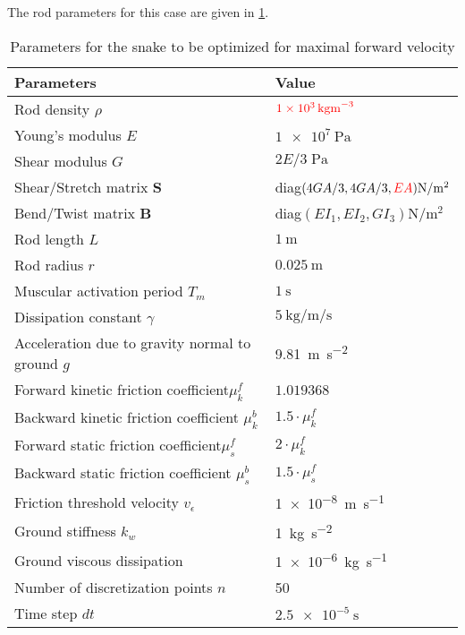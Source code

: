 \documentclass[11pt]{article}
\begin{document}
The rod parameters for this case are given in \cref{tab_opt_snake_params}.

\begin{table}[htbp]
\caption{\label{tab_opt_snake_params}
Parameters for the snake to be optimized for maximal forward velocity}
\centering
\begin{tabular}{ll}
\toprule
Parameters & Value\\
\midrule
Rod density \(\rho\) & \(\textcolor{red}{\SI{1e3}{\kg \m^{-3}}}\)\\
Young's modulus \(E\) & \(\SI{1e7}{\Pa}\)\\
Shear modulus \(G\) & \(2E/3\;\si{\Pa}\)\\
Shear/Stretch matrix \(\mathbf{S}\) & diag\((4GA/3, 4GA/3, \textcolor{red}{EA}) \si{\N\per\m^2}\)\\
Bend/Twist matrix \(\mathbf{B}\) & diag\((EI_1, EI_2, GI_3) \si{\N\per\m^2}\)\\
Rod length \(L\) & \(\SI{1}{\m}\)\\
Rod radius \(r\) & \(\SI{0.025}{\m}\)\\
Muscular activation period \(T_m\) & \(\SI{1}{\second}\)\\
Dissipation constant \(\gamma\) & \(\SI{5}{\kg\per\m\per\second}\)\\
Acceleration due to gravity normal to ground \(g\) & \SI{9.81}{\m \per \s^2}\\
Forward kinetic friction coefficient\(\mu^f_k\) & \(1.019368\)\\
Backward kinetic friction coefficient \(\mu^b_k\) & \(1.5 \cdot  \mu^f_k\)\\
Forward static friction coefficient\(\mu^f_s\) & \(2 \cdot  \mu^f_k\)\\
Backward static friction coefficient \(\mu^b_s\) & \(1.5 \cdot  \mu^f_s\)\\
Friction threshold velocity \(v_{\epsilon}\) & \SI{1e-8}{\m\per\s}\\
Ground stiffness \(k_w\) & \SI{1}{\kg \per \s^2}\\
Ground viscous dissipation & \SI{1e-6}{\kg \per \s}\\
Number of discretization points \(n\) & 50\\
Time step \(dt\) & \(\SI{2.5e-5}{\second}\)\\
\bottomrule
\end{tabular}
\end{table}
\end{document}
